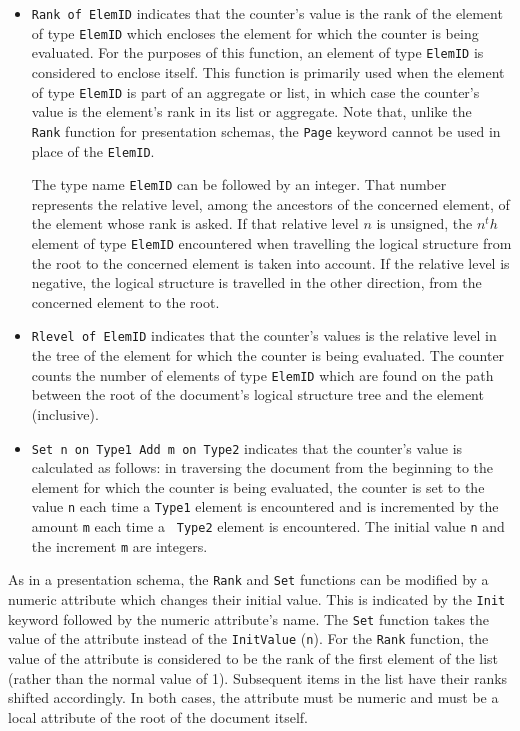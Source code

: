 \begin{itemize}
\item
{\tt Rank of ElemID} indicates that the counter's value is the rank of
the element of type {\tt ElemID} which encloses the element for which
the counter is being evaluated.  For the purposes of this function, an
element of type {\tt ElemID} is considered to enclose itself.  This
function is primarily used  when the element of type {\tt ElemID} is
part of an aggregate or list, in which case the counter's value is the
element's rank in its list or aggregate.  Note that, unlike the {\tt
Rank} function for presentation schemas, the {\tt Page} keyword cannot
be used in place of the {\tt ElemID}.

The type name {\tt ElemID} can be followed by an integer.  That number
represents the relative level, among the ancestors of the concerned element,
of the element whose rank is asked.  If that relative level $n$ is
unsigned, the $n^th$ element of type {\tt ElemID} encountered when
travelling the logical structure from the root to the concerned element
is taken into account.  If the relative level is negative, the logical
structure is travelled in the other direction, from the concerned element
to the root.

\item
{\tt Rlevel of ElemID} indicates that the counter's values is the
relative level in the tree of the element for which the counter is
being evaluated.  The counter counts the number of elements of type
{\tt ElemID} which are found on the path between the root of the
document's logical structure tree and the element (inclusive).

\item
{\tt Set n on Type1 Add m on Type2} indicates that the counter's value
is calculated as follows:  in traversing the document from the
beginning to the element for which the counter is being evaluated, the
counter is set to the value {\tt n} each time a {\tt Type1} element is
encountered and is incremented by the amount {\tt m} each time a {\tt
Type2} element is encountered.  The initial value {\tt n} and the
increment {\tt m} are integers.
\end{itemize}

As in a presentation schema, the {\tt Rank} and {\tt Set} functions
can be modified by a numeric attribute which changes their initial
value.  This is indicated by the {\tt Init} keyword followed by the
numeric attribute's name.  The {\tt Set} function takes the value of
the attribute instead of the {\tt InitValue} ({\tt n}).  For the {\tt Rank}
function, the value of the attribute is considered to be the rank of
the first element of the list (rather than the normal value of 1).
Subsequent items in the list have their ranks shifted accordingly.  In
both cases, the attribute must be numeric and must be a local
attribute of the root of the document itself.

